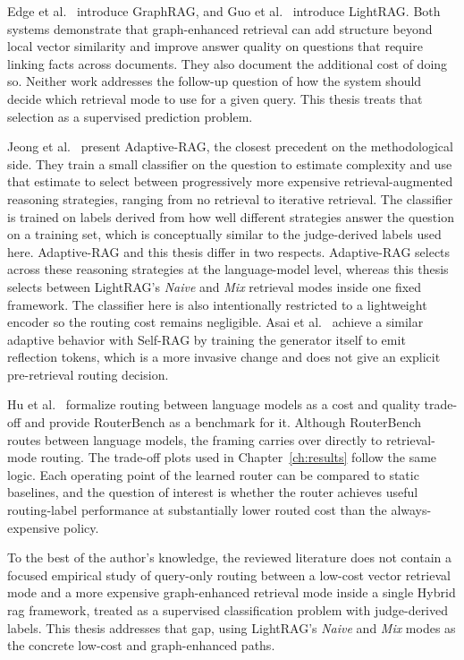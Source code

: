 \documentclass[english, bibtex]{kththesis}               %
\numberwithin{listing}{chapter}
\begin{document}
Edge et al.\ \cite{edge2024graphrag} introduce GraphRAG, and Guo et al.\ \cite{lightrag2024} introduce LightRAG. Both systems demonstrate that graph-enhanced retrieval can add structure beyond local vector similarity and improve answer quality on questions that require linking facts across documents. They also document the additional cost of doing so. Neither work addresses the follow-up question of how the system should decide which retrieval mode to use for a given query. This thesis treats that selection as a supervised prediction problem.

Jeong et al.\ \cite{jeong2024adaptiverag} present Adaptive-RAG, the closest precedent on the methodological side. They train a small classifier on the question to estimate complexity and use that estimate to select between progressively more expensive retrieval-augmented reasoning strategies, ranging from no retrieval to iterative retrieval. The classifier is trained on labels derived from how well different strategies answer the question on a training set, which is conceptually similar to the judge-derived labels used here. Adaptive-RAG and this thesis differ in two respects. Adaptive-RAG selects across these reasoning strategies at the language-model level, whereas this thesis selects between LightRAG's \emph{Naive} and \emph{Mix} retrieval modes inside one fixed framework. The classifier here is also intentionally restricted to a lightweight encoder so the routing cost remains negligible. Asai et al.\ \cite{asai2023selfrag} achieve a similar adaptive behavior with Self-RAG by training the generator itself to emit reflection tokens, which is a more invasive change and does not give an explicit pre-retrieval routing decision.

Hu et al.\ \cite{hu2024routerbench} formalize routing between language models as a cost and quality trade-off and provide RouterBench as a benchmark for it. Although RouterBench routes between language models, the framing carries over directly to retrieval-mode routing. The trade-off plots used in Chapter~\ref{ch:results} follow the same logic. Each operating point of the learned router can be compared to static baselines, and the question of interest is whether the router achieves useful routing-label performance at substantially lower routed cost than the always-expensive policy.

To the best of the author's knowledge, the reviewed literature does not contain a focused empirical study of query-only routing between a low-cost vector retrieval mode and a more expensive graph-enhanced retrieval mode inside a single Hybrid \gls{rag} framework, treated as a supervised classification problem with judge-derived labels. This thesis addresses that gap, using LightRAG's \emph{Naive} and \emph{Mix} modes as the concrete low-cost and graph-enhanced paths.
\end{document}
